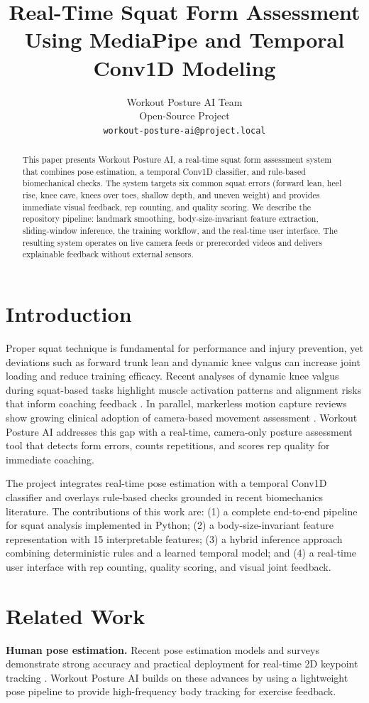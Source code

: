 \documentclass[11pt]{article}
\title{Real-Time Squat Form Assessment Using MediaPipe and Temporal Conv1D Modeling}
\author{Workout Posture AI Team \\
  Open-Source Project \\
  \texttt{workout-posture-ai@project.local}}
\begin{document}
\maketitle

\begin{abstract}
This paper presents Workout Posture AI, a real-time squat form assessment system that combines pose estimation, a temporal Conv1D classifier, and rule-based biomechanical checks. The system targets six common squat errors (forward lean, heel rise, knee cave, knees over toes, shallow depth, and uneven weight) and provides immediate visual feedback, rep counting, and quality scoring. We describe the repository pipeline: landmark smoothing, body-size-invariant feature extraction, sliding-window inference, the training workflow, and the real-time user interface. The resulting system operates on live camera feeds or prerecorded videos and delivers explainable feedback without external sensors.
\end{abstract}

\section{Introduction}
Proper squat technique is fundamental for performance and injury prevention, yet deviations such as forward trunk lean and dynamic knee valgus can increase joint loading and reduce training efficacy. Recent analyses of dynamic knee valgus during squat-based tasks highlight muscle activation patterns and alignment risks that inform coaching feedback \cite{khou2024valgus}. In parallel, markerless motion capture reviews show growing clinical adoption of camera-based movement assessment \cite{lam2023mmc}. Workout Posture AI addresses this gap with a real-time, camera-only posture assessment tool that detects form errors, counts repetitions, and scores rep quality for immediate coaching.

The project integrates real-time pose estimation with a temporal Conv1D classifier and overlays rule-based checks grounded in recent biomechanics literature. The contributions of this work are: (1) a complete end-to-end pipeline for squat analysis implemented in Python; (2) a body-size-invariant feature representation with 15 interpretable features; (3) a hybrid inference approach combining deterministic rules and a learned temporal model; and (4) a real-time user interface with rep counting, quality scoring, and visual joint feedback.

\section{Related Work}
\textbf{Human pose estimation.} Recent pose estimation models and surveys demonstrate strong accuracy and practical deployment for real-time 2D keypoint tracking \cite{xu2022vitpose, zhou2023survey}. Workout Posture AI builds on these advances by using a lightweight pose pipeline to provide high-frequency body tracking for exercise feedback.
\end{document}
